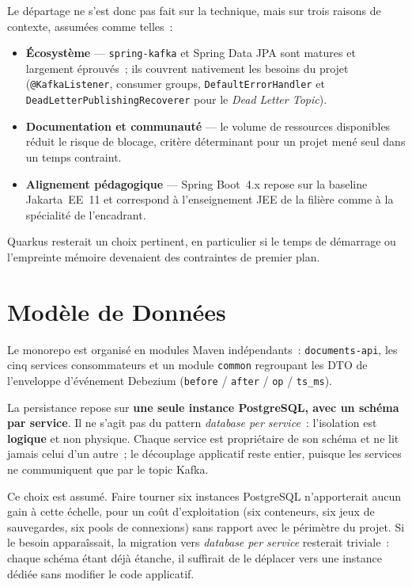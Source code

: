 \documentclass[12pt,a4paper,openany]{report}
\begin{document}
    Le d\'epartage ne s'est donc pas fait sur la technique, mais sur trois raisons de contexte, assum\'ees comme telles~:

    \begin{itemize}[noitemsep]
      \item \textbf{\'Ecosyst\`eme} --- \texttt{spring-kafka} et Spring Data JPA sont matures et largement \'eprouv\'es~; ils couvrent nativement les besoins du projet (\texttt{@KafkaListener}, consumer groups, \texttt{DefaultErrorHandler} et \texttt{DeadLetterPublishingRecoverer} pour le \emph{Dead Letter Topic}).
      \item \textbf{Documentation et communaut\'e} --- le volume de ressources disponibles r\'eduit le risque de blocage, crit\`ere d\'eterminant pour un projet men\'e seul dans un temps contraint.
      \item \textbf{Alignement p\'edagogique} --- Spring Boot~4.x repose sur la baseline Jakarta~EE~11 et correspond \`a l'enseignement JEE de la fili\`ere comme \`a la sp\'ecialit\'e de l'encadrant.
    \end{itemize}

    Quarkus resterait un choix pertinent, en particulier si le temps de d\'emarrage ou l'empreinte m\'emoire devenaient des contraintes de premier plan.

    \chapter{Mod\`ele de Donn\'ees}

    Le monorepo est organis\'e en modules Maven ind\'ependants~: \texttt{documents-api}, les cinq services consommateurs et un module \texttt{common} regroupant les DTO de l'enveloppe d'\'ev\'enement Debezium (\texttt{before} / \texttt{after} / \texttt{op} / \texttt{ts\_ms}).

    La persistance repose sur \textbf{une seule instance PostgreSQL, avec un sch\'ema par service}. Il ne s'agit pas du pattern \emph{database per service}~: l'isolation est \textbf{logique} et non physique. Chaque service est propri\'etaire de son sch\'ema et ne lit jamais celui d'un autre~; le d\'ecouplage applicatif reste entier, puisque les services ne communiquent que par le topic Kafka.

    Ce choix est assum\'e. Faire tourner six instances PostgreSQL n'apporterait aucun gain \`a cette \'echelle, pour un co\^ut d'exploitation (six conteneurs, six jeux de sauvegardes, six pools de connexions) sans rapport avec le p\'erim\`etre du projet. Si le besoin appara\^issait, la migration vers \emph{database per service} resterait triviale~: chaque sch\'ema \'etant d\'ej\`a \'etanche, il suffirait de le d\'eplacer vers une instance d\'edi\'ee sans modifier le code applicatif.
\end{document}
